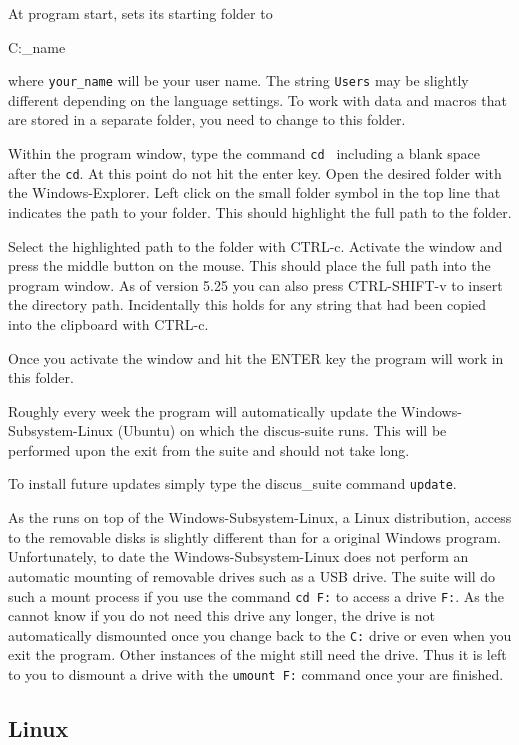 At program start, \Suite sets its starting folder to\\
\begin{MacVerbatim}
   C:\Users\your_name
\end{MacVerbatim}
where {\tt your\_name} will be your user name. The string {\tt Users}
may be slightly different depending on the language settings.
To work with data and macros that are stored in a separate folder,
you need to change to this folder.

Within the \Suite program window, type the command {\tt cd } including a
blank space after the {\tt cd}. At this point do not hit the enter key.
Open the desired folder with the Windows-Explorer. Left click on the
small folder symbol in the top line that indicates the path to your
folder. This should highlight the full path to the folder.

Select the highlighted path to the folder
with CTRL-c. Activate the \Suite window and press the
middle button on the mouse. This should place the full path into the
program window. As of version 5.25 you can also press CTRL-SHIFT-v to
insert the directory path. Incidentally this holds for any string that had
been copied into the clipboard with CTRL-c. 

Once you activate the window and hit the ENTER key the program will
work in this folder.

Roughly every week the program will automatically update the 
Windows-Subsystem-Linux (Ubuntu) on which the discus-suite runs. 
This will be performed upon the exit from the suite and should not take long.

To install future updates simply type the discus\_suite command {\tt update}.

As the \Suite runs on top of the Windows-Subsystem-Linux, a Linux distribution,
access to the removable disks is slightly different than for a original Windows 
program. Unfortunately, to date the Windows-Subsystem-Linux does not perform 
an automatic mounting of removable drives such as a USB drive. The suite will
do such a mount process if you use the command {\tt cd F:} to access a drive 
{\tt F:}. As the \Suite cannot know if you do not need this drive any longer, 
the drive is not automatically dismounted once you change back to the {\tt C:}
drive or even when you exit the program. Other instances of the \Suite might still
need the drive. Thus it is left to you to dismount a drive with the 
{\tt umount F:} command once your are finished.

\subsection{Linux}



